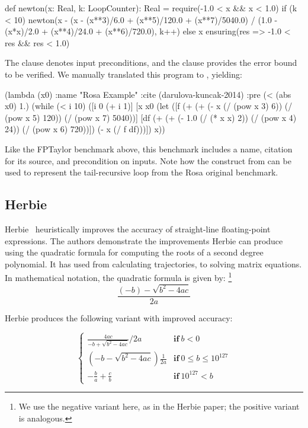 \documentclass[main.tex]{subfiles}
\begin{document}
\begin{code}
def newton(x: Real, k: LoopCounter): Real = {
  require(-1.0 < x && x < 1.0)
  if (k < 10) {
    newton(x - (x - (x**3)/6.0 + (x**5)/120.0 + (x**7)/5040.0) / 
      (1.0 - (x*x)/2.0 + (x**4)/24.0 + (x**6)/720.0), k++)
  } else {
    x
  }
} ensuring(res => -1.0 < res && res < 1.0)
\end{code}

The  clause denotes input preconditions, and the
 clause provides the error bound to be verified. We manually
translated this program to \core, yielding:

\begin{code}
(lambda (x0)
  :name "Rosa Example"
  :cite (darulova-kuncak-2014)
  :pre (< (abs x0) 1.)
  (while (< i 10)
    ([i 0 (+ i 1)]
     [x x0
      (let ([f (+ (+ (- x (/ (pow x 3) 6))
                     (/ (pow x 5) 120)) (/ (pow x 7) 5040))]
            [df (+ (+ (- 1.0 (/ (* x x) 2)) 
                      (/ (pow x 4) 24)) (/ (pow x 6) 720))])
        (- x (/ f df)))])
    x))
\end{code}

Like the FPTaylor benchmark above, this benchmark includes a name,
  citation for its source, and precondition on inputs.
Note how the  construct from \core
  can be used to represent the tail-recursive loop
  from the Rosa original benchmark.

\subsection{Herbie}

Herbie~\cite{pavel15} heuristically improves the accuracy of straight-line
floating-point expressions.  The authors demonstrate the improvements
Herbie can produce using the quadratic formula for computing the roots of a
second degree polynomial.  It has used from calculating trajectories, to
solving matrix equations.  In mathematical notation, the quadratic formula
is given by:
%
\footnote{We use the negative variant here, as in the Herbie paper;
  the positive variant is analogous.}
%
\begin{equation*}
  \frac{(- b) - \sqrt{b^2 - 4ac}}{2a}
\end{equation*}

\noindent Herbie produces the following variant with improved accuracy:

\newcommand{\K}[1]{\mathbf{#1}\:}

\begin{equation*}
\begin{cases}
  \frac{4ac}{-b + \sqrt{b^2 - 4ac}}/2a & \K{if} b < 0 \\[9pt]
  \left(-b - \sqrt{b^2 - 4ac}\right)\frac1{2a} & \K{if} 0 \le b \le 10^{127} \\[5pt]
  -\frac{b}{a} + \frac{c}{b} & \K{if} 10^{127} < b
\end{cases}
\end{equation*}
\end{document}
